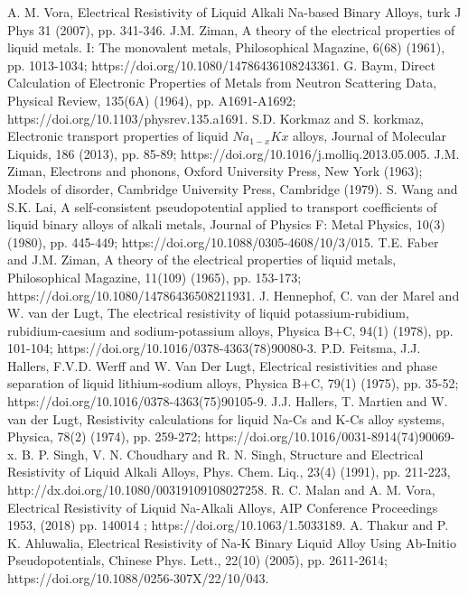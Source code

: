 \documentclass[final,12pt]{elsarticle}
\begin{document}
{\begin{thebibliography}{thesis}
	A. M. Vora, Electrical Resistivity of Liquid Alkali Na-based Binary
	Alloys, turk J Phys 31 (2007), pp. 341-346.
	J.M. Ziman, A theory of the electrical properties of liquid metals. I: The monovalent metals, Philosophical Magazine, 6(68) (1961), pp. 1013-1034; https://doi.org/10.1080/14786436108243361.
	G. Baym, Direct Calculation of Electronic Properties of Metals from Neutron Scattering Data, Physical Review, 135(6A) (1964), pp. A1691-A1692; https://doi.org/10.1103/physrev.135.a1691.
	S.D. Korkmaz and S. korkmaz, Electronic transport properties of liquid $Na_{1-x}Kx$ alloys, Journal of Molecular Liquids, 186 (2013), pp. 85-89; https://doi.org/10.1016/j.molliq.2013.05.005.
	 J.M. Ziman, Electrons and phonons, Oxford University Press, New York (1963); Models of disorder, Cambridge University Press, Cambridge (1979).
	S. Wang and S.K. Lai, A self-consistent pseudopotential applied to transport coefficients of liquid binary alloys of alkali metals, Journal of Physics F: Metal Physics, 10(3) (1980), pp. 445-449; https://doi.org/10.1088/0305-4608/10/3/015.
	T.E. Faber and J.M. Ziman, A theory of the electrical properties of liquid metals, Philosophical Magazine, 11(109) (1965), pp. 153-173; https://doi.org/10.1080/14786436508211931.
	J. Hennephof, C. van der Marel and W. van der Lugt, The electrical resistivity of liquid potassium-rubidium, rubidium-caesium and sodium-potassium alloys, Physica B+C, 94(1) (1978), pp. 101-104; https://doi.org/10.1016/0378-4363(78)90080-3.
	P.D. Feitsma, J.J. Hallers, F.V.D. Werff and W. Van Der Lugt, Electrical resistivities and phase separation of liquid lithium-sodium alloys, Physica B+C, 79(1) (1975), pp. 35-52; https://doi.org/10.1016/0378-4363(75)90105-9.
	J.J. Hallers, T. Martien and W. van der Lugt, Resistivity calculations for liquid Na-Cs and K-Cs alloy systems, Physica, 78(2) (1974), pp. 259-272; https://doi.org/10.1016/0031-8914(74)90069-x.
	B. P. Singh, V. N. Choudhary and R. N. Singh, Structure and Electrical Resistivity of Liquid Alkali Alloys, Phys. Chem. Liq., 23(4) (1991), pp. 211-223, http://dx.doi.org/10.1080/00319109108027258.
	R. C. Malan and A. M. Vora, Electrical Resistivity of Liquid Na-Alkali Alloys, AIP Conference Proceedings 1953, (2018) pp. 140014 ; https://doi.org/10.1063/1.5033189.
	A. Thakur and P. K. Ahluwalia, Electrical Resistivity of Na-K Binary Liquid Alloy Using Ab-Initio Pseudopotentials, Chinese Phys. Lett., 22(10) (2005), pp. 2611-2614; https://doi.org/10.1088/0256-307X/22/10/043.

\end{thebibliography}}
\end{document}
